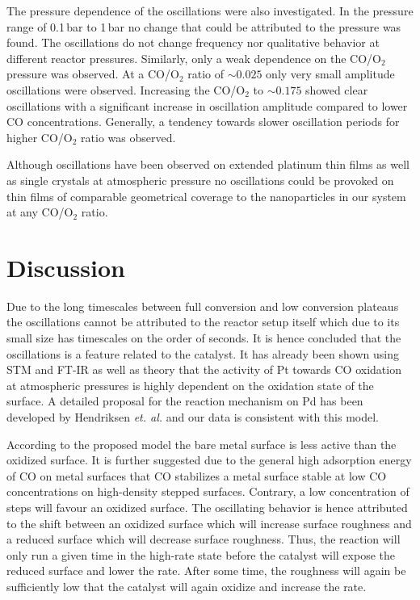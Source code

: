 \documentclass[8.5pt,twoside,twocolumn]{article}
\begin{document}
The pressure dependence of the oscillations were also investigated. In the pressure range of 0.1\,bar to 1\,bar no change that could be attributed to the pressure was found. The oscillations do not change frequency nor qualitative behavior at different reactor pressures. Similarly, only a weak dependence on the CO/O$_2$ pressure was observed. At a CO/O$_2$ ratio of $\sim0.025$ only very small amplitude oscillations were observed. Increasing the CO/O$_2$ to $\sim0.175$ showed clear oscillations with a significant increase in oscillation amplitude compared to lower CO concentrations. Generally, a tendency towards slower oscillation periods for higher CO/O$_2$ ratio was observed.

Although oscillations have been observed on extended platinum thin films \cite{Singh2010} as well as single crystals\cite{Hendriksen2005} at atmospheric pressure no oscillations could be provoked on thin films of comparable geometrical coverage to the nanoparticles in our system at any CO/O$_2$ ratio.  

\section{Discussion}
Due to the long timescales between full conversion and low conversion plateaus the oscillations cannot be attributed to the reactor setup itself which due to its small size has timescales on the order of seconds. It is hence concluded that the oscillations is a feature related to the catalyst. It has already been shown using STM \cite{Hendriksen2002} and FT-IR \cite{Carlsson2006} as well as theory \cite{Gong2004} that the activity of Pt towards CO oxidation at atmospheric pressures is highly dependent on the oxidation state of the surface. A detailed proposal for the reaction mechanism on Pd has been developed by Hendriksen \textit{et. al.}\cite{Hendriksen2010} and our data is consistent with this model.

According to the proposed model the bare metal surface is less active than the oxidized surface. It is further suggested due to the general high adsorption energy of CO on metal surfaces that CO stabilizes a metal surface stable at low CO concentrations on high-density stepped surfaces. Contrary, a low concentration of steps will favour an oxidized surface. The oscillating behavior is hence attributed to the shift between an oxidized surface which will increase surface roughness and a reduced surface which will decrease surface roughness. Thus, the reaction will only run a given time in the high-rate state before the catalyst will expose the reduced surface and lower the rate. After some time, the roughness will again be sufficiently low that the catalyst will again oxidize and increase the rate.
\end{document}
